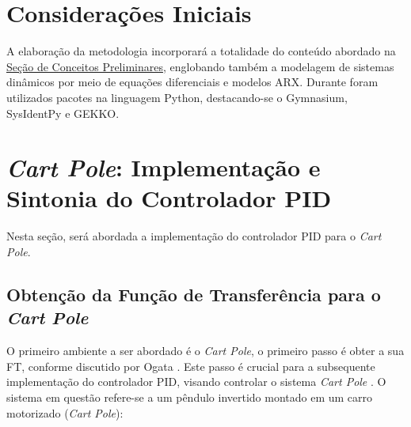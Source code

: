 \documentclass[12pt,           %
a4paper,                       %
openany,                       %
oneside,                       %
chapter=TITLE,                 %
english,                       %
spanish,                       %
brazil,                        %
sumario=tradicional]{abntex2}  %
\begin{document}
\begin{OnehalfSpace}
\section{Considerações Iniciais}
\label{sec:considIniciaisMetodologia}               %

A elaboração da metodologia incorporará a totalidade do conteúdo abordado na \hyperref[ch:conceitosPreliminares]{Seção de Conceitos Preliminares}, englobando também a modelagem de sistemas dinâmicos por meio de equações diferenciais e modelos ARX. Durante foram utilizados pacotes na linguagem Python, destacando-se o Gymnasium, SysIdentPy e GEKKO.


\section{\textit{Cart Pole}: Implementação e Sintonia do Controlador PID}
\label{sec:pidcartpole}                     %

Nesta seção, será abordada a implementação do controlador PID para o \textit{Cart Pole}.

\subsection{Obtenção da Função de Transferência para o \textit{Cart Pole}}
\label{subsec:titprov}                     %

O primeiro ambiente a ser abordado é o \textit{Cart Pole}, o primeiro passo é obter a sua FT, conforme discutido por Ogata \cite{ogata2010engenharia}. Este passo é crucial para a subsequente implementação do controlador PID, visando controlar o sistema \textit{Cart Pole} \cite{cpepid}. O sistema em questão refere-se a um pêndulo invertido montado em um carro motorizado (\textit{Cart Pole}):


\end{OnehalfSpace}
\end{document}
